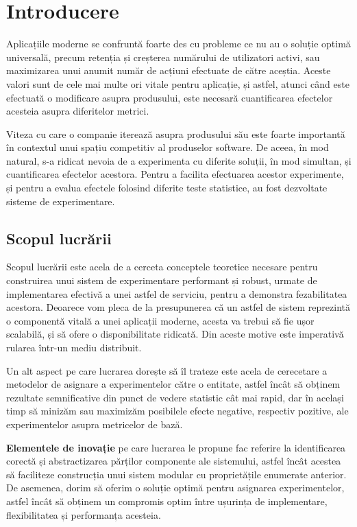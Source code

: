 \chapter{Introducere}

Aplicațiile moderne se confruntă foarte des cu probleme ce nu au o soluție optimă universală, precum retenția și creșterea numărului de utilizatori activi, sau maximizarea unui anumit număr de acțiuni efectuate de către aceștia. Aceste valori sunt de cele mai multe ori vitale pentru aplicație, și astfel, atunci când este efectuată o modificare asupra produsului, este necesară cuantificarea efectelor acesteia asupra diferitelor metrici. 

Viteza cu care o companie iterează asupra produsului său este foarte importantă în contextul unui spațiu competitiv al produselor software. De aceea, în mod natural, s-a ridicat nevoia de a experimenta cu diferite soluții, în mod simultan, și cuantificarea efectelor acestora. Pentru a facilita efectuarea acestor experimente, și pentru a evalua efectele folosind diferite teste statistice, au fost dezvoltate sisteme de experimentare. 

\section{Scopul lucrării}

Scopul lucrării este acela de a cerceta conceptele teoretice necesare pentru construirea unui sistem de experimentare performant și robust, urmate de implementarea efectivă a unei astfel de serviciu, pentru a demonstra fezabilitatea acestora. Deoarece vom pleca de la presupunerea că un astfel de sistem reprezintă o componentă vitală a unei aplicații moderne, acesta va trebui să fie ușor scalabilă, și să ofere o disponibilitate ridicată. Din aceste motive este imperativă rularea într-un mediu distribuit.

Un alt aspect pe care lucrarea dorește să îl trateze este acela de cerecetare a metodelor de asignare a experimentelor către o entitate, astfel încât să obținem rezultate semnificative din punct de vedere statistic cât mai rapid, dar în același timp să minizăm sau maximizăm posibilele efecte negative, respectiv pozitive, ale experimentelor asupra metricelor de bază. 

\textbf{Elementele de inovație} pe care lucrarea le propune fac referire la identificarea corectă și abstractizarea părților componente ale sistemului, astfel încât acestea să faciliteze construcția unui sistem modular cu proprietățile enumerate anterior. De asemenea, dorim să oferim o soluție optimă pentru asignarea experimentelor, astfel încât să obținem un compromis optim între ușurința de implementare, flexibilitatea și  performanța acesteia.

